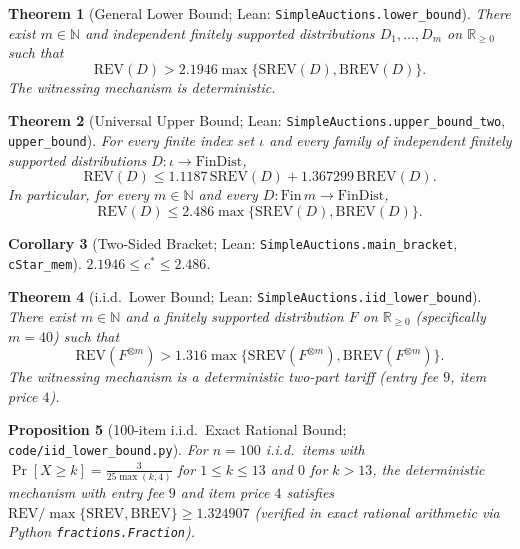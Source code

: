 \documentclass[11pt]{article}
\newtheorem{theorem}{Theorem}
\newtheorem{corollary}[theorem]{Corollary}
\newtheorem{proposition}[theorem]{Proposition}
\newcommand{\REV}{\mathrm{REV}}
\newcommand{\SREV}{\mathrm{SREV}}
\newcommand{\BREV}{\mathrm{BREV}}
\newcommand{\R}{\mathbb{R}}
\begin{document}
\begin{theorem}[General Lower Bound; Lean: \texttt{SimpleAuctions.lower\_bound}]\label{thm:lb}
There exist $m \in \mathbb{N}$ and independent finitely supported distributions $D_1, \dots, D_m$ on $\R_{\ge 0}$ such that
\[
  \REV(D) > 2.1946 \max\{\SREV(D), \BREV(D)\}.
\]
The witnessing mechanism is deterministic.
\end{theorem}

\begin{theorem}[Universal Upper Bound; Lean: \texttt{SimpleAuctions.upper\_bound\_two}, \texttt{upper\_bound}]\label{thm:ub}
For every finite index set $\iota$ and every family of independent finitely supported distributions $D : \iota \to \mathrm{FinDist}$,
\[
  \REV(D) \le 1.1187\,\SREV(D) + 1.367299\,\BREV(D).
\]
In particular, for every $m \in \mathbb{N}$ and every $D : \mathrm{Fin}\,m \to \mathrm{FinDist}$,
\[
  \REV(D) \le 2.486 \max\{\SREV(D), \BREV(D)\}.
\]
\end{theorem}

\begin{corollary}[Two-Sided Bracket; Lean: \texttt{SimpleAuctions.main\_bracket}, \texttt{cStar\_mem}]\label{cor:bracket}
$2.1946 \le c^* \le 2.486$.
\end{corollary}

\begin{theorem}[i.i.d.\ Lower Bound; Lean: \texttt{SimpleAuctions.iid\_lower\_bound}]\label{thm:iid}
There exist $m \in \mathbb{N}$ and a finitely supported distribution $F$ on $\R_{\ge 0}$ (specifically $m = 40$) such that
\[
  \REV(F^{\otimes m}) > 1.316 \max\{\SREV(F^{\otimes m}), \BREV(F^{\otimes m})\}.
\]
The witnessing mechanism is a deterministic two-part tariff (entry fee $9$, item price $4$).
\end{theorem}

\begin{proposition}[100-item i.i.d.\ Exact Rational Bound; \texttt{code/iid\_lower\_bound.py}]\label{prop:iid100}
For $n = 100$ i.i.d.\ items with $\Pr[X \ge k] = \frac{3}{25 \max(k,4)}$ for $1 \le k \le 13$ and $0$ for $k > 13$, the deterministic mechanism with entry fee $9$ and item price $4$ satisfies $\REV / \max\{\SREV, \BREV\} \ge 1.324907$ (verified in exact rational arithmetic via Python \texttt{fractions.Fraction}).
\end{proposition}
\end{document}
